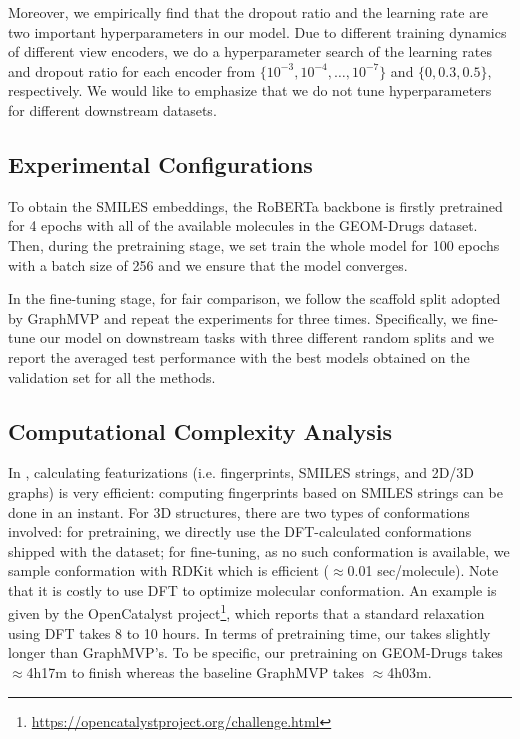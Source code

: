 Moreover, we empirically find that the dropout ratio \cite{Srivastava:2014cg} and the learning rate are two important hyperparameters in our model.
Due to different training dynamics of different view encoders, we do a hyperparameter search of the learning rates and dropout ratio for each encoder from $\{10^{-3},10^{-4},\dots,10^{-7}\}$ and $\{0, 0.3, 0.5\}$, respectively.
We would like to emphasize that we do not tune hyperparameters for different downstream datasets.

\subsection{Experimental Configurations}

To obtain the SMILES embeddings, the RoBERTa backbone is firstly pretrained for 4 epochs with all of the available molecules in the GEOM-Drugs dataset.
Then, during the pretraining stage, we set train the whole model for 100 epochs with a batch size of 256 and we ensure that the model converges.

In the fine-tuning stage, for fair comparison, we follow the scaffold split adopted by GraphMVP \cite{Liu:2022vr} and repeat the experiments for three times.
Specifically, we fine-tune our model on downstream tasks with three different random splits and we report the averaged test performance with the best models obtained on the validation set for all the methods.

\subsection{Computational Complexity Analysis}
In \themodel, calculating featurizations (i.e. fingerprints, SMILES strings, and 2D/3D graphs) is very efficient: computing fingerprints based on SMILES strings can be done in an instant. For 3D structures, there are two types of conformations involved: for pretraining, we directly use the DFT-calculated conformations shipped with the dataset; for fine-tuning, as no such conformation is available, we sample conformation with RDKit which is efficient ($\approx$0.01 sec/molecule). Note that it is costly to use DFT to optimize molecular conformation. An example is given by the OpenCatalyst project\footnote{\url{https://opencatalystproject.org/challenge.html}}, which reports that a standard relaxation using DFT takes 8 to 10 hours.
In terms of pretraining time, our \themodel takes slightly longer than GraphMVP's. To be specific, our pretraining on GEOM-Drugs takes $\approx$4h17m to finish whereas the baseline GraphMVP takes $\approx$4h03m.

